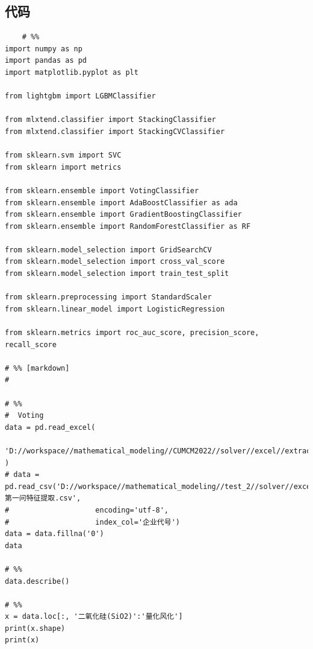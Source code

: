 \documentclass[UTF8]{ctexart}
\begin{document}
\clearpage





% 

\subsection*{代码}

\lstset{language=Python}
\begin{lstlisting}
	# %%
import numpy as np
import pandas as pd
import matplotlib.pyplot as plt

from lightgbm import LGBMClassifier

from mlxtend.classifier import StackingClassifier
from mlxtend.classifier import StackingCVClassifier

from sklearn.svm import SVC
from sklearn import metrics

from sklearn.ensemble import VotingClassifier
from sklearn.ensemble import AdaBoostClassifier as ada
from sklearn.ensemble import GradientBoostingClassifier
from sklearn.ensemble import RandomForestClassifier as RF

from sklearn.model_selection import GridSearchCV
from sklearn.model_selection import cross_val_score
from sklearn.model_selection import train_test_split

from sklearn.preprocessing import StandardScaler
from sklearn.linear_model import LogisticRegression

from sklearn.metrics import roc_auc_score, precision_score, recall_score

# %% [markdown]
#

# %%
#  Voting
data = pd.read_excel(
    'D://workspace//mathematical_modeling//CUMCM2022//solver//excel//extract//3//data_merage.xlsx'
)
# data = pd.read_csv('D://workspace//mathematical_modeling//test_2//solver//excel//extract//1//第一问特征提取.csv',
#                    encoding='utf-8',
#                    index_col='企业代号')
data = data.fillna('0')
data

# %%
data.describe()

# %%
x = data.loc[:, '二氧化硅(SiO2)':'量化风化']
print(x.shape)
print(x)


\end{lstlisting}
\end{document}

